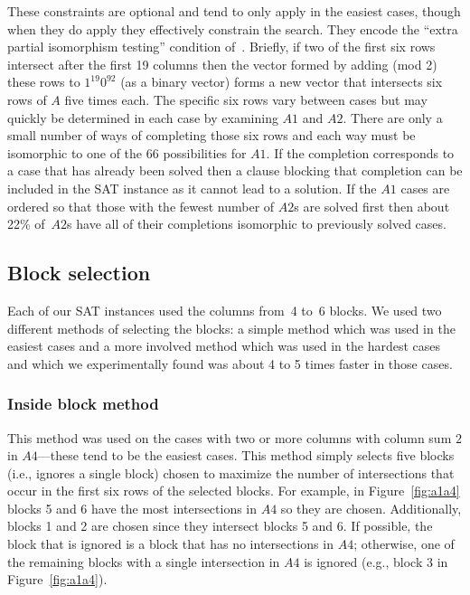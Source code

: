 \documentclass[letterpaper]{article}
\begin{document}
These constraints are optional and tend to only apply in the
easiest cases, though when they do apply
they effectively constrain the search.
They encode the ``extra partial
isomorphism testing'' condition of~\cite{lam1989non}.
Briefly, if two of the first six rows intersect after the first 19
columns then the vector formed by adding (mod 2) these rows
to $1^{19}0^{92}$ (as a binary vector) forms a new vector
that intersects six rows of $A$ five times each.  The specific six rows
vary between cases but may quickly
be determined in each case by examining $A1$ and $A2$.  There
are only a small number of ways of completing those six rows and each
way must be isomorphic to one of the 66 possibilities for $A1$.
If the completion corresponds to a case that has already been solved
then a clause blocking that completion can be
included in the SAT instance as it cannot lead to a solution.
If the $A1$ cases are ordered so that those with the fewest number
of $A2$s are solved first then about~%
22\% of~$A2$s have all of their completions isomorphic
to previously solved cases.

\subsection{Block selection}\label{subsec:block}

Each of our SAT instances used the columns
from~4 to~6 blocks.  We used two different methods of selecting the
blocks: a simple method which was used in the easiest cases and a
more involved method which was used in the hardest cases and
which we experimentally found was about 4 to 5 times faster
in those cases.

\subsubsection{Inside block method}

This method was used on the cases with two or more columns with
column sum $2$ in $A4$---these tend to be the easiest cases.
This method simply selects five blocks (i.e., ignores a single block)
chosen to maximize the number of intersections that occur
in the first six rows of the selected blocks.
For example, in Figure~\ref{fig:a1a4} blocks 5 and 6 have the most
intersections in $A4$ so they are chosen.  Additionally,
blocks 1 and 2 are chosen since they intersect blocks 5 and 6.
If possible, the block that is ignored is a block that
has no intersections in $A4$; otherwise, one of the remaining
blocks with a single intersection in $A4$ is ignored
(e.g., block 3 in Figure~\ref{fig:a1a4}).
\end{document}
